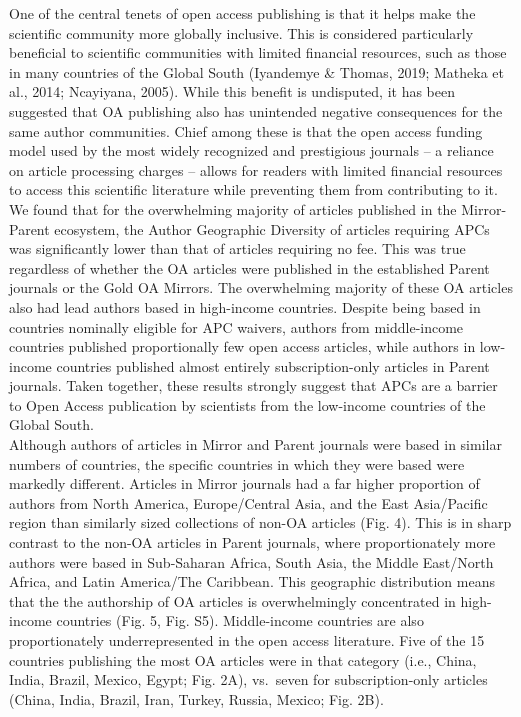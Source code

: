 \documentclass[
  english,
  man]{apa6}
\begin{document}
One of the central tenets of open access publishing is that it helps make the scientific community more globally inclusive. This is considered particularly beneficial to scientific communities with limited financial resources, such as those in many countries of the Global South (Iyandemye \& Thomas, 2019; Matheka et al., 2014; Ncayiyana, 2005). While this benefit is undisputed, it has been suggested that OA publishing also has unintended negative consequences for the same author communities. Chief among these is that the open access funding model used by the most widely recognized and prestigious journals -- a reliance on article processing charges -- allows for readers with limited financial resources to access this scientific literature while preventing them from contributing to it. We found that for the overwhelming majority of articles published in the Mirror-Parent ecosystem, the Author Geographic Diversity of articles requiring APCs was significantly lower than that of articles requiring no fee. This was true regardless of whether the OA articles were published in the established Parent journals or the Gold OA Mirrors. The overwhelming majority of these OA articles also had lead authors based in high-income countries. Despite being based in countries nominally eligible for APC waivers, authors from middle-income countries published proportionally few open access articles, while authors in low-income countries published almost entirely subscription-only articles in Parent journals. Taken together, these results strongly suggest that APCs are a barrier to Open Access publication by scientists from the low-income countries of the Global South.\\
Although authors of articles in Mirror and Parent journals were based in similar numbers of countries, the specific countries in which they were based were markedly different. Articles in Mirror journals had a far higher proportion of authors from North America, Europe/Central Asia, and the East Asia/Pacific region than similarly sized collections of non-OA articles (Fig. 4). This is in sharp contrast to the non-OA articles in Parent journals, where proportionately more authors were based in Sub-Saharan Africa, South Asia, the Middle East/North Africa, and Latin America/The Caribbean. This geographic distribution means that the the authorship of OA articles is overwhelmingly concentrated in high-income countries (Fig. 5, Fig. S5). Middle-income countries are also proportionately underrepresented in the open access literature. Five of the 15 countries publishing the most OA articles were in that category (i.e., China, India, Brazil, Mexico, Egypt; Fig. 2A), vs.~seven for subscription-only articles (China, India, Brazil, Iran, Turkey, Russia, Mexico; Fig. 2B).\\
\end{document}
